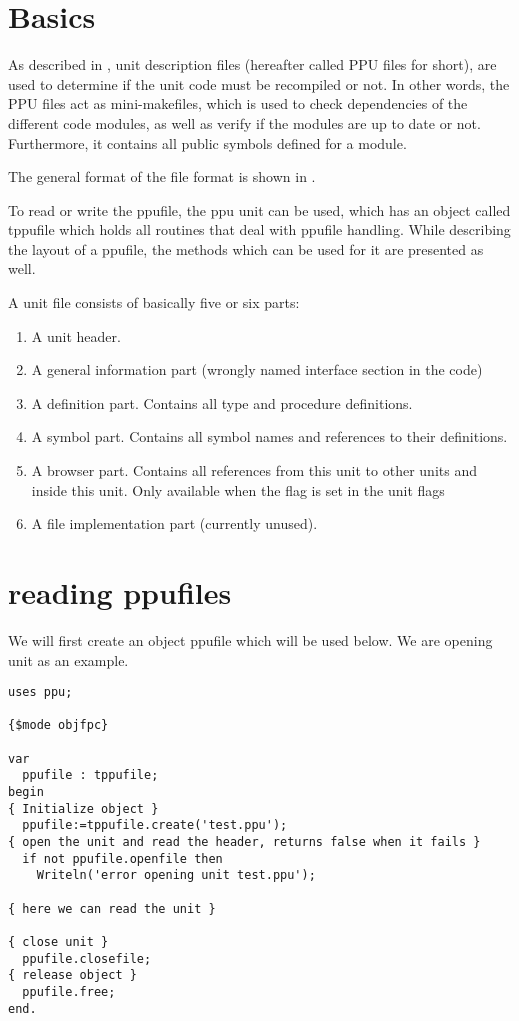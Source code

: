 \section{Basics}
As described in , unit description files (hereafter
called PPU files for short), are used to determine if the unit
code must be recompiled or not. In other words, the PPU files act
as mini-makefiles, which is used to check dependencies of the
different code modules, as well as verify if the modules are up
to date or not. Furthermore, it contains all public symbols defined
for a module.

The general format of the  file format is shown
in .


To read or write the ppufile, the ppu unit  can be used,
which has an object called tppufile which holds all routines that deal
with ppufile handling. While describing the layout of a ppufile, the
methods which can be used for it are presented as well.

A unit file consists of basically five or six parts:
\begin{enumerate}
\item A unit header.
\item A general information part (wrongly named interface section in the code)
\item A definition part. Contains all type and procedure definitions.
\item A symbol part. Contains all symbol names and references to their
definitions.
\item A browser part. Contains all references from this unit to other
units and inside this unit. Only available when the  flag is
set in the unit flags
\item A file implementation part (currently unused).
\end{enumerate}

\section{reading ppufiles}

We will first create an object ppufile which will be used below. We are
opening unit  as an example.

\begin{verbatim}
uses ppu;

{$mode objfpc}

var
  ppufile : tppufile;
begin
{ Initialize object }
  ppufile:=tppufile.create('test.ppu');
{ open the unit and read the header, returns false when it fails }
  if not ppufile.openfile then
    Writeln('error opening unit test.ppu');

{ here we can read the unit }

{ close unit }
  ppufile.closefile;
{ release object }
  ppufile.free;
end.
\end{verbatim}

